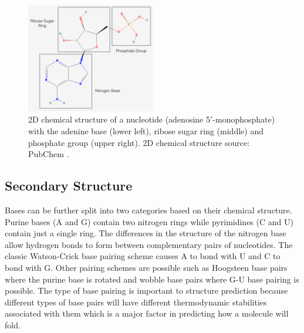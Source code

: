 \documentclass[journal]{IEEEtran}
\begin{document}
\begin{figure}[t]
\centering
\includegraphics[width=0.5\textwidth]{img/nucleotide.png}
\caption{2D chemical structure of a nucleotide (adenosine 5$'$-monophosphate) with the adenine base (lower left), ribose sugar ring (middle) and phosphate group (upper right). 2D chemical structure source: PubChem \cite{adenine2016pubchem}.}
\label{fig:nucleotide}
\end{figure}
 
\subsection{Secondary Structure}
\label{subsec:intro-rna-sec-structure}

 Bases can be further split into two categories based on their chemical structure. Purine bases (A and G) contain two nitrogen rings while pyrimidines (C and U) contain just a single ring. The differences in the structure of the nitrogen base allow hydrogen bonds to form between complementary pairs of nucleotides. The classic Watson-Crick base pairing scheme causes A to bond with U and C to bond with G. Other pairing schemes are possible such as Hoogsteen base pairs where the purine base is rotated and wobble base pairs where G-U base pairing is possible. The type of base pairing is important to structure prediction because different types of base pairs will have different thermodynamic stabilities associated with them which is a major factor in predicting how a molecule will fold.
 
\end{document}
